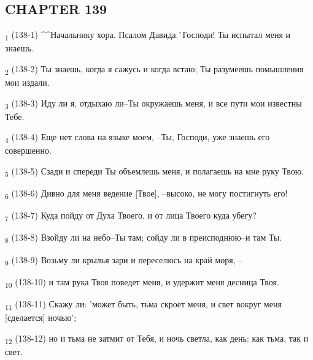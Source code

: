 \subsection{CHAPTER 139}
\begin{tcolorbox}
\textsubscript{1} (138-1) ^^Начальнику хора. Псалом Давида.^^ Господи! Ты испытал меня и знаешь.
\end{tcolorbox}
\begin{tcolorbox}
\textsubscript{2} (138-2) Ты знаешь, когда я сажусь и когда встаю; Ты разумеешь помышления мои издали.
\end{tcolorbox}
\begin{tcolorbox}
\textsubscript{3} (138-3) Иду ли я, отдыхаю ли--Ты окружаешь меня, и все пути мои известны Тебе.
\end{tcolorbox}
\begin{tcolorbox}
\textsubscript{4} (138-4) Еще нет слова на языке моем, --Ты, Господи, уже знаешь его совершенно.
\end{tcolorbox}
\begin{tcolorbox}
\textsubscript{5} (138-5) Сзади и спереди Ты объемлешь меня, и полагаешь на мне руку Твою.
\end{tcolorbox}
\begin{tcolorbox}
\textsubscript{6} (138-6) Дивно для меня ведение [Твое], --высоко, не могу постигнуть его!
\end{tcolorbox}
\begin{tcolorbox}
\textsubscript{7} (138-7) Куда пойду от Духа Твоего, и от лица Твоего куда убегу?
\end{tcolorbox}
\begin{tcolorbox}
\textsubscript{8} (138-8) Взойду ли на небо--Ты там; сойду ли в преисподнюю--и там Ты.
\end{tcolorbox}
\begin{tcolorbox}
\textsubscript{9} (138-9) Возьму ли крылья зари и переселюсь на край моря, --
\end{tcolorbox}
\begin{tcolorbox}
\textsubscript{10} (138-10) и там рука Твоя поведет меня, и удержит меня десница Твоя.
\end{tcolorbox}
\begin{tcolorbox}
\textsubscript{11} (138-11) Скажу ли: 'может быть, тьма скроет меня, и свет вокруг меня [сделается] ночью';
\end{tcolorbox}
\begin{tcolorbox}
\textsubscript{12} (138-12) но и тьма не затмит от Тебя, и ночь светла, как день: как тьма, так и свет.
\end{tcolorbox}
